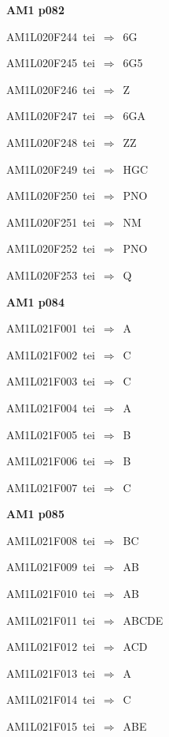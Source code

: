 \par\vfill\eject
{\bf\hfill AM1 p082\hfill\hbox{}}\par\bigskip
{\sixrm AM1L020F244\ {\sixit tei}\ }$\Rightarrow$\ 6G\par\smallskip
{\sixrm AM1L020F245\ {\sixit tei}\ }$\Rightarrow$\ 6G5\par\smallskip
{\sixrm AM1L020F246\ {\sixit tei}\ }$\Rightarrow$\ Z\par\smallskip
{\sixrm AM1L020F247\ {\sixit tei}\ }$\Rightarrow$\ 6GA\par\smallskip
{\sixrm AM1L020F248\ {\sixit tei}\ }$\Rightarrow$\ ZZ\par\smallskip
{\sixrm AM1L020F249\ {\sixit tei}\ }$\Rightarrow$\ HGC\par\smallskip
{\sixrm AM1L020F250\ {\sixit tei}\ }$\Rightarrow$\ PNO\par\smallskip
{\sixrm AM1L020F251\ {\sixit tei}\ }$\Rightarrow$\ NM\par\smallskip
{\sixrm AM1L020F252\ {\sixit tei}\ }$\Rightarrow$\ PNO\par\smallskip
{\sixrm AM1L020F253\ {\sixit tei}\ }$\Rightarrow$\ Q\par\smallskip

\par\vfill\eject
{\bf\hfill AM1 p084\hfill\hbox{}}\par\bigskip
{\sixrm AM1L021F001\ {\sixit tei}\ }$\Rightarrow$\ A\par\smallskip
{\sixrm AM1L021F002\ {\sixit tei}\ }$\Rightarrow$\ C\par\smallskip
{\sixrm AM1L021F003\ {\sixit tei}\ }$\Rightarrow$\ C\par\smallskip
{\sixrm AM1L021F004\ {\sixit tei}\ }$\Rightarrow$\ A\par\smallskip
{\sixrm AM1L021F005\ {\sixit tei}\ }$\Rightarrow$\ B\par\smallskip
{\sixrm AM1L021F006\ {\sixit tei}\ }$\Rightarrow$\ B\par\smallskip
{\sixrm AM1L021F007\ {\sixit tei}\ }$\Rightarrow$\ C\par\smallskip

\par\vfill\eject
{\bf\hfill AM1 p085\hfill\hbox{}}\par\bigskip
{\sixrm AM1L021F008\ {\sixit tei}\ }$\Rightarrow$\ BC\par\smallskip
{\sixrm AM1L021F009\ {\sixit tei}\ }$\Rightarrow$\ AB\par\smallskip
{\sixrm AM1L021F010\ {\sixit tei}\ }$\Rightarrow$\ AB\par\smallskip
{\sixrm AM1L021F011\ {\sixit tei}\ }$\Rightarrow$\ ABCDE\par\smallskip
{\sixrm AM1L021F012\ {\sixit tei}\ }$\Rightarrow$\ ACD\par\smallskip
{\sixrm AM1L021F013\ {\sixit tei}\ }$\Rightarrow$\ A\par\smallskip
{\sixrm AM1L021F014\ {\sixit tei}\ }$\Rightarrow$\ C\par\smallskip
{\sixrm AM1L021F015\ {\sixit tei}\ }$\Rightarrow$\ ABE\par\smallskip

